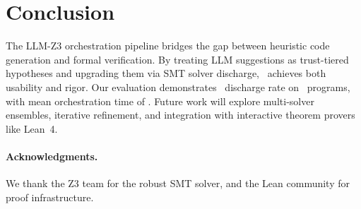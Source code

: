 \documentclass[11pt]{article}
\begin{document}
\section{Conclusion}\label{sec:conclusion}

The LLM-Z3 orchestration pipeline bridges the gap between heuristic code 
generation and formal verification. By treating LLM suggestions as trust-tiered 
hypotheses and upgrading them via SMT solver discharge, \JuGeo\ achieves both 
usability and rigor. Our evaluation demonstrates \ppLIdischargeRate\ discharge rate 
on \ppLItotalPrograms\ programs, with mean orchestration time of \ppLImeanOrchTime. 
Future work will explore multi-solver ensembles, iterative refinement, and 
integration with interactive theorem provers like Lean~4.

\paragraph{Acknowledgments.}
We thank the Z3 team for the robust SMT solver, and the Lean community for 
proof infrastructure.
\end{document}
